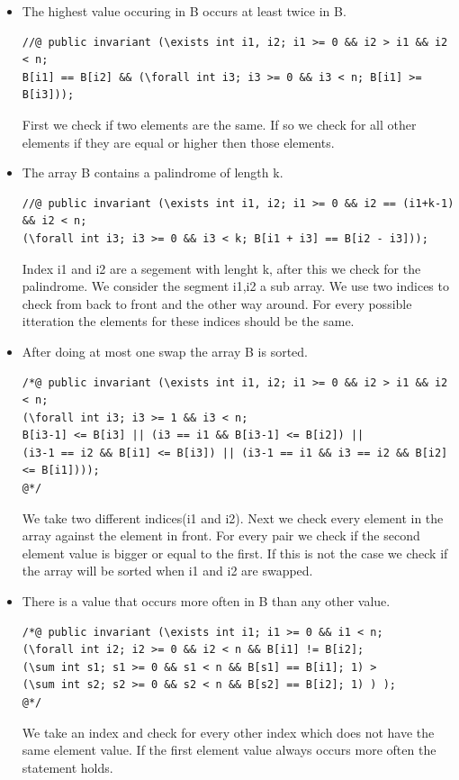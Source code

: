 \documentclass[a4paper]{article}
\begin{document}
\begin{itemize}
		\item The highest value occuring in B occurs at least twice in B.
		\begin{lstlisting}
//@ public invariant (\exists int i1, i2; i1 >= 0 && i2 > i1 && i2 < n;
B[i1] == B[i2] && (\forall int i3; i3 >= 0 && i3 < n; B[i1] >= B[i3]));	
		\end{lstlisting}
		First we check if two elements are the same. If so we check for all other elements if they are equal or higher then those elements.
		
		\item The array B contains a palindrome of length k.
		\begin{lstlisting}
//@ public invariant (\exists int i1, i2; i1 >= 0 && i2 == (i1+k-1) && i2 < n;
(\forall int i3; i3 >= 0 && i3 < k; B[i1 + i3] == B[i2 - i3]));	
		\end{lstlisting}
		Index i1 and i2 are a segement with lenght k, after this we check for the palindrome. We consider the segment i1,i2 a sub array. We use two indices to check from back to front and the other way around. For every possible itteration the elements for these indices should be the same.
		
		\item After doing at most one swap the array B is sorted.
		\begin{lstlisting}
/*@ public invariant (\exists int i1, i2; i1 >= 0 && i2 > i1 && i2 < n;
(\forall int i3; i3 >= 1 && i3 < n; 
B[i3-1] <= B[i3] || (i3 == i1 && B[i3-1] <= B[i2]) ||
(i3-1 == i2 && B[i1] <= B[i3]) || (i3-1 == i1 && i3 == i2 && B[i2] <= B[i1])));
@*/
		\end{lstlisting}
		We take two different indices(i1 and i2). Next we check every element in the array against the element in front. For every pair we check if the second element value is bigger or equal to the first. If this is not the case we check if the array will be sorted when i1 and i2 are swapped. 
		
		\item There is a value that occurs more often in B than any other value.
		\begin{lstlisting}
/*@ public invariant (\exists int i1; i1 >= 0 && i1 < n;
(\forall int i2; i2 >= 0 && i2 < n && B[i1] != B[i2]; 
(\sum int s1; s1 >= 0 && s1 < n && B[s1] == B[i1]; 1) >
(\sum int s2; s2 >= 0 && s2 < n && B[s2] == B[i2]; 1) ) );
@*/
		\end{lstlisting}
		We take an index and check for every other index which does not have the same element value. If the first element value always occurs more often the statement holds.
		
	\end{itemize}
	\newpage
	
\end{document}
